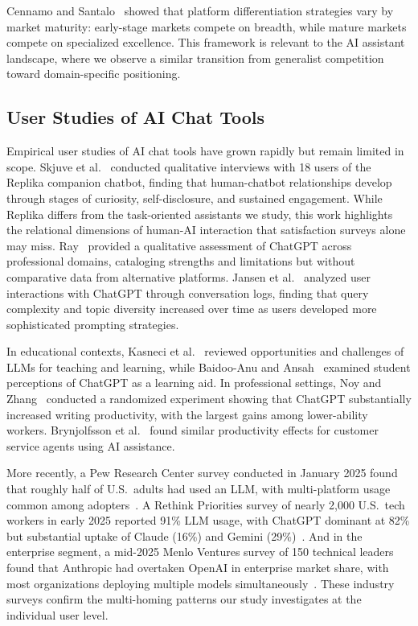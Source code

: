 \documentclass[10pt,twocolumn]{article}
\begin{document}
Cennamo and Santalo~\cite{cennamo2013} showed that platform differentiation strategies vary by market maturity: early-stage markets compete on breadth, while mature markets compete on specialized excellence. This framework is relevant to the AI assistant landscape, where we observe a similar transition from generalist competition toward domain-specific positioning.

\subsection{User Studies of AI Chat Tools}

Empirical user studies of AI chat tools have grown rapidly but remain limited in scope. Skjuve et al.~\cite{skjuve2023} conducted qualitative interviews with 18 users of the Replika companion chatbot, finding that human-chatbot relationships develop through stages of curiosity, self-disclosure, and sustained engagement. While Replika differs from the task-oriented assistants we study, this work highlights the relational dimensions of human-AI interaction that satisfaction surveys alone may miss. Ray~\cite{ray2023} provided a qualitative assessment of ChatGPT across professional domains, cataloging strengths and limitations but without comparative data from alternative platforms. Jansen et al.~\cite{jansen2023} analyzed user interactions with ChatGPT through conversation logs, finding that query complexity and topic diversity increased over time as users developed more sophisticated prompting strategies.

In educational contexts, Kasneci et al.~\cite{kasneci2023} reviewed opportunities and challenges of LLMs for teaching and learning, while Baidoo-Anu and Ansah~\cite{baidoo2023} examined student perceptions of ChatGPT as a learning aid. In professional settings, Noy and Zhang~\cite{noy2023} conducted a randomized experiment showing that ChatGPT substantially increased writing productivity, with the largest gains among lower-ability workers. Brynjolfsson et al.~\cite{brynjolfsson2023} found similar productivity effects for customer service agents using AI assistance.

More recently, a Pew Research Center survey conducted in January 2025 found that roughly half of U.S.\ adults had used an LLM, with multi-platform usage common among adopters~\cite{pew2025}. A Rethink Priorities survey of nearly 2,000 U.S.\ tech workers in early 2025 reported 91\% LLM usage, with ChatGPT dominant at 82\% but substantial uptake of Claude (16\%) and Gemini (29\%)~\cite{rethink2025}. And in the enterprise segment, a mid-2025 Menlo Ventures survey of 150 technical leaders found that Anthropic had overtaken OpenAI in enterprise market share, with most organizations deploying multiple models simultaneously~\cite{menlo2025}. These industry surveys confirm the multi-homing patterns our study investigates at the individual user level.
\end{document}
